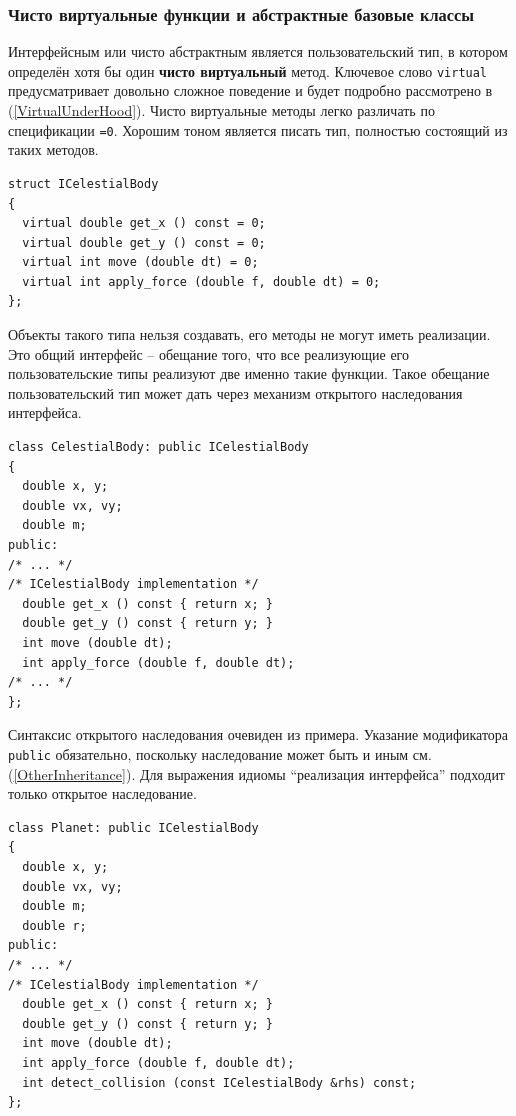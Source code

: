 \documentclass[a4paper,12pt,oneside]{article}
\begin{document}
\subsubsection{Чисто виртуальные функции и абстрактные базовые классы}\label{PureVirtual}

Интерфейсным или чисто абстрактным является пользовательский тип, в котором определён хотя бы один \textbf{чисто виртуальный} метод. Ключевое слово \lstinline!virtual! предусматривает довольно сложное поведение и будет подробно рассмотрено в (\ref{VirtualUnderHood}). Чисто виртуальные методы легко различать по спецификации \lstinline!=0!. Хорошим тоном является писать тип, полностью состоящий из таких методов.

\begin{lstlisting}
struct ICelestialBody
{
  virtual double get_x () const = 0;
  virtual double get_y () const = 0;
  virtual int move (double dt) = 0;
  virtual int apply_force (double f, double dt) = 0;
};
\end{lstlisting}

Объекты такого типа нельзя создавать, его методы не могут иметь реализации. Это общий интерфейс -- обещание того, что все реализующие его пользовательские типы реализуют две именно такие функции. Такое обещание пользовательский тип может дать через механизм открытого наследования интерфейса.

\begin{lstlisting}
class CelestialBody: public ICelestialBody
{
  double x, y;
  double vx, vy;
  double m;
public:
/* ... */
/* ICelestialBody implementation */
  double get_x () const { return x; }
  double get_y () const { return y; }
  int move (double dt); 
  int apply_force (double f, double dt);
/* ... */
};
\end{lstlisting}

Синтаксис открытого наследования очевиден из примера. Указание модификатора \lstinline!public! обязательно, поскольку наследование может быть и иным см. (\ref{OtherInheritance}). Для выражения идиомы ``реализация интерфейса'' подходит только открытое наследование. 

\begin{lstlisting}
class Planet: public ICelestialBody
{
  double x, y;
  double vx, vy;
  double m;
  double r;
public:
/* ... */
/* ICelestialBody implementation */
  double get_x () const { return x; }
  double get_y () const { return y; }
  int move (double dt);
  int apply_force (double f, double dt);
  int detect_collision (const ICelestialBody &rhs) const;
};
\end{lstlisting}
\end{document}
